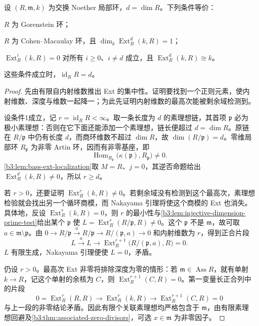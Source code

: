 \begin{theorem}\label{b3:thm:gorenstein-bass-criterion}
	设 \((R,\mathfrak m,k)\) 为交换 Noether 局部环，\(d=\dim R\)。下列条件等价：
	\begin{equivalences}
		\item \(R\) 为 Gorenstein 环；
		\item \(R\) 为 Cohen--Macaulay 环，且 \(\dim_k\operatorname{Ext}_R^d(k,R)=1\)；
		\item \(\operatorname{Ext}_R^i(k,R)=0\) 对所有 \(i\ge0\)、\(i\ne d\) 成立，且 \(\operatorname{Ext}_R^d(k,R)\cong k\)。
	\end{equivalences}
	这些条件成立时，\(\operatorname{id}_RR=d\)。
\end{theorem}
\begin{proof}
	先由有限自内射维数推出 Ext 的集中性。证明要找到一个正则元素，使内射维数、深度与维数一起降一；为此先证明内射维数的最高次能被剩余域检测到。

	设条件1成立，记 \(r=\operatorname{id}_RR<\infty\)。取一条长度为 \(d\) 的素理想链，其首项 \(\mathfrak p\) 必为极小素理想：否则在它下面还能添加一个素理想，链长便超过 \(d=\dim R\)。原链在 \(R/\mathfrak p\) 中仍有长度 \(d\)，而商环维数不超过 \(\dim R\)，故 \(\dim(R/\mathfrak p)=d\)。零维局部环 \(R_{\mathfrak p}\) 为非零 Artin 环，因而有非零基座，即
	\[
		\operatorname{Hom}_{R_{\mathfrak p}}\bigl(\kappa(\mathfrak p),R_{\mathfrak p}\bigr)\ne0.
	\]
	\cref{b3:lem:bass-ext-localization}取 \(M=R\)、\(j=0\)，其逆否命题给出 \(\operatorname{Ext}_R^d(k,R)\ne0\)，所以 \(r\ge d\)。

	若 \(r>0\)，还要证明 \(\operatorname{Ext}_R^r(k,R)\ne0\)。若剩余域没有检测到这个最高次，素理想检验就会找出另一个循环商模，而 Nakayama 引理将使这个商模的 Ext 也消失。具体地，反设 \(\operatorname{Ext}_R^r(k,R)=0\)，则 \(r\) 的最小性与\cref{b3:lem:injective-dimension-prime-test}给出某个 \(\mathfrak p\) 使 \(L=\operatorname{Ext}_R^r(R/\mathfrak p,R)\ne0\)。这个 \(\mathfrak p\) 不是 \(\mathfrak m\)，故可取 \(a\in\mathfrak m\setminus\mathfrak p\)。由 \(0\rightarrow R/\mathfrak p\xrightarrow{a}R/\mathfrak p\rightarrow R/(\mathfrak p,a)\rightarrow0\) 和内射维数为 \(r\)，得到正合片段
	\[
		L\xrightarrow{a}L\longrightarrow \operatorname{Ext}_R^{r+1}\bigl(R/(\mathfrak p,a),R\bigr)=0.
	\]
	\(L\) 有限生成，Nakayama 引理便使 \(L=0\)，矛盾。

	仍设 \(r>0\)。最高次 Ext 非零将排除深度为零的情形：若 \(\mathfrak m\in\operatorname{Ass}R\)，就有单射 \(k\rightarrow R\)，记这个单射的余核为 \(C\)，则 \(\operatorname{Ext}_R^{r+1}(C,R)=0\)。第一变量长正合列中的片段
	\[
		0=\operatorname{Ext}_R^r(R,R) \longrightarrow\operatorname{Ext}_R^r(k,R) \longrightarrow\operatorname{Ext}_R^{r+1}(C,R)=0
	\]
	与上一段的非零结论矛盾。因此有限个关联素理想均严格包含于 \(\mathfrak m\)，由有限素理想回避及\cref{b3:thm:associated-zero-divisors}，可选 \(x\in\mathfrak m\) 为非零因子。


\end{proof}
